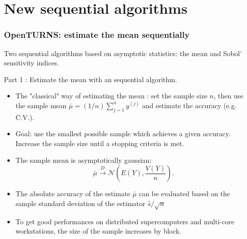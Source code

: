 \documentclass{beamer}
\begin{document}


\section{New sequential algorithms}


\begin{frame}[containsverbatim]
\frametitle{OpenTURNS: estimate the mean sequentially}

Two sequential algorithms based on asymptotic statistics: the mean 
and Sobol' sensitivity indices.


Part 1 : Estimate the mean with an sequential algorithm.
\begin{itemize}
\item The "classical" way of estimating the mean : set the sample size $n$, 
then use the sample mean $\bar{\mu} = (1/n) \sum_{j=1}^n y^{(j)}$ and 
estimate the accuracy (e.g. C.V.).

\item Goal: use the smallest possible sample which achieves 
a given accuracy. Increase the sample size until a stopping criteria is met.

\item The sample mean is asymptotically gaussian:
$$
\bar{\mu} \xrightarrow{D} \mathcal{N}\left(E(Y),\frac{V(Y)}{n}\right).
$$

\item The absolute accuracy of the estimate $\bar{\mu}$ can be evaluated based on the sample
standard deviation of the estimator $\hat{s} / \sqrt{n}$ 

\item To get good performances on distributed supercomputers and 
multi-core workstations, the size of the sample increases by block.

\end{itemize}

\end{frame}
\end{document}
